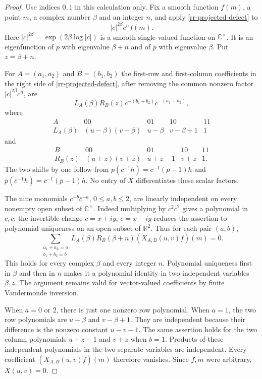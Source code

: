\begin{proof}
Use indices $0,1$ in this calculation only.
Fix a smooth function $f(m)$, a point $m$, a complex
number $\beta$ and an integer $n$, and apply
\eqref{rr-projected-defect} to
\[
                     |c|^{2\beta}c^n f(m).
\]
Here $|c|^{2\beta}=\exp(2\beta\log|c|)$ is a smooth
single-valued function on $\mathbb C^\times$.
It is an eigenfunction of $p$ with eigenvalue
$\beta+n$ and of $\bar p$ with eigenvalue $\beta$.
Put $z=\beta+n$.

For $A=(a_1,a_2)$ and $B=(b_1,b_2)$ the first-row
and first-column coefficients in the right side of
\eqref{rr-projected-defect}, after removing the
common nonzero factor $|c|^{2\beta}c^n$, are
\[
      L_A(\beta)R_B(z)c^{-(b_1+b_2)}\bar c^{-(a_1+a_2)},
\]
where
\[
\begin{array}{c|cccc}
A&00&01&10&11\\ \hline
L_A(\beta)&(u-\beta)(v-\beta)&u-\beta&v-\beta+1&1
\end{array}
\]
and
\[
\begin{array}{c|cccc}
B&00&01&10&11\\ \hline
R_B(z)&(u+z)(v+z)&u+z-1&v+z&1.
\end{array}
\]
The two shifts by one follow from
$p(c^{-1}h)=c^{-1}(p-1)h$ and
$\bar p(\bar c^{-1}h)=\bar c^{-1}(\bar p-1)h$.
No entry of $X$ differentiates these scalar factors.

The nine monomials
$c^{-b}\bar c^{-a}$, $0\leq a,b\leq2$,
are linearly independent on every nonempty open subset
of $\mathbb C^\times$.  Indeed multiplying by
$c^2\bar c^2$ gives a polynomial in $c,\bar c$;
the invertible change $c=x+iy$, $\bar c=x-iy$
reduces the assertion to polynomial uniqueness on
an open subset of $\mathbb R^2$.
Thus for each pair $(a,b)$,
\[
 \sum_{\substack{a_1+a_2=a\\b_1+b_2=b}}
 L_A(\beta)R_B(\beta+n)(X_{A,B}(u,v)f)(m)=0.
\]
This holds for every complex $\beta$ and every
integer $n$.  Polynomial uniqueness first in
$\beta$ and then in $n$ makes it a polynomial
identity in two independent variables $\beta,z$.
The argument remains valid for vector-valued
coefficients by finite Vandermonde inversion.

When $a=0$ or $2$, there is just one nonzero row
polynomial.  When $a=1$, the two row polynomials
are $u-\beta$ and $v-\beta+1$.
They are independent because their difference is
the nonzero constant $u-v-1$.
The same assertion holds for the two column
polynomials $u+z-1$ and $v+z$ when $b=1$.
Products of these independent polynomials in the
two separate variables are independent.
Every coefficient $(X_{A,B}(u,v)f)(m)$ therefore
vanishes.  Since $f,m$ were arbitrary, $X(u,v)=0$.
\end{proof}

